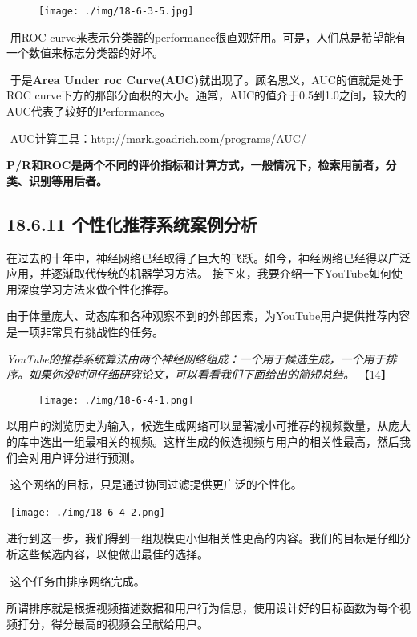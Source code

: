 \begin{figure}
\centering
\texttt{[image: ./img/18-6-3-5.jpg]}
\caption{}
\end{figure}

​ 用ROC
curve来表示分类器的performance很直观好用。可是，人们总是希望能有一个数值来标志分类器的好坏。

​ 于是\textbf{Area Under roc
Curve(AUC)}就出现了。顾名思义，AUC的值就是处于ROC
curve下方的那部分面积的大小。通常，AUC的值介于0.5到1.0之间，较大的AUC代表了较好的Performance。

​ AUC计算工具：\url{http://mark.goadrich.com/programs/AUC/}

​
\textbf{P/R和ROC是两个不同的评价指标和计算方式，一般情况下，检索用前者，分类、识别等用后者。}

\subsection{18.6.11
个性化推荐系统案例分析}\label{ux4e2aux6027ux5316ux63a8ux8350ux7cfbux7edfux6848ux4f8bux5206ux6790}

​
在过去的十年中，神经网络已经取得了巨大的飞跃。如今，神经网络已经得以广泛应用，并逐渐取代传统的机器学习方法。
接下来，我要介绍一下YouTube如何使用深度学习方法来做个性化推荐。

​
由于体量庞大、动态库和各种观察不到的外部因素，为YouTube用户提供推荐内容是一项非常具有挑战性的任务。

​
\emph{YouTube的推荐系统算法由两个神经网络组成：一个用于候选生成，一个用于排序。如果你没时间仔细研究论文，可以看看我们下面给出的简短总结。}
【14】

\begin{figure}
\centering
\texttt{[image: ./img/18-6-4-1.png]}
\caption{}
\end{figure}

​
以用户的浏览历史为输入，候选生成网络可以显著减小可推荐的视频数量，从庞大的库中选出一组最相关的视频。这样生成的候选视频与用户的相关性最高，然后我们会对用户评分进行预测。

​ 这个网络的目标，只是通过协同过滤提供更广泛的个性化。

​ \texttt{[image: ./img/18-6-4-2.png]}

​
进行到这一步，我们得到一组规模更小但相关性更高的内容。我们的目标是仔细分析这些候选内容，以便做出最佳的选择。

​ 这个任务由排序网络完成。

​
所谓排序就是根据视频描述数据和用户行为信息，使用设计好的目标函数为每个视频打分，得分最高的视频会呈献给用户。

